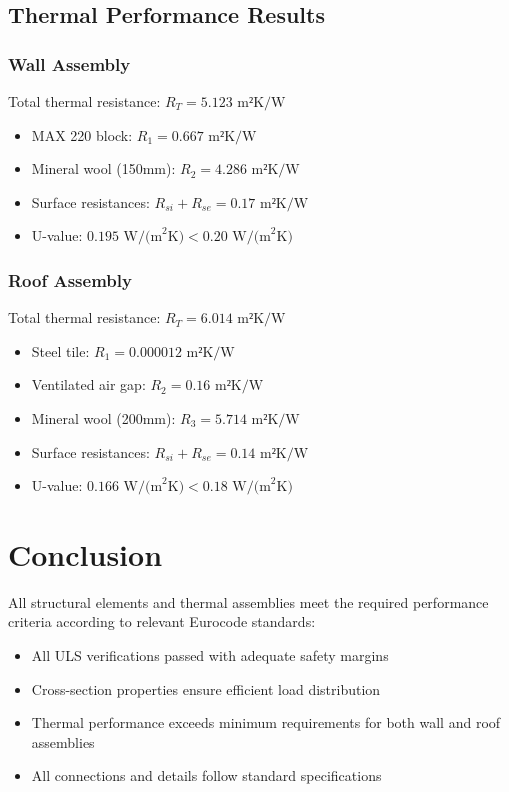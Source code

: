 \documentclass[12pt,a4paper]{article}
\begin{document}
\subsection{Thermal Performance Results}
\subsubsection{Wall Assembly}
Total thermal resistance: $R_T = 5.123 \text{ m²K/W}$
\begin{itemize}
    \item MAX 220 block: $R_1 = 0.667 \text{ m²K/W}$
    \item Mineral wool (150mm): $R_2 = 4.286 \text{ m²K/W}$
    \item Surface resistances: $R_{si} + R_{se} = 0.17 \text{ m²K/W}$
    \item U-value: $0.195 \text{ W/(m}^2\text{K)} < 0.20 \text{ W/(m}^2\text{K)}$ \checkmark
\end{itemize}

\subsubsection{Roof Assembly}
Total thermal resistance: $R_T = 6.014 \text{ m²K/W}$
\begin{itemize}
    \item Steel tile: $R_1 = 0.000012 \text{ m²K/W}$
    \item Ventilated air gap: $R_2 = 0.16 \text{ m²K/W}$
    \item Mineral wool (200mm): $R_3 = 5.714 \text{ m²K/W}$
    \item Surface resistances: $R_{si} + R_{se} = 0.14 \text{ m²K/W}$
    \item U-value: $0.166 \text{ W/(m}^2\text{K)} < 0.18 \text{ W/(m}^2\text{K)}$ \checkmark
\end{itemize}

\section{Conclusion}
All structural elements and thermal assemblies meet the required performance criteria according to relevant Eurocode standards:
\begin{itemize}
    \item All ULS verifications passed with adequate safety margins
    \item Cross-section properties ensure efficient load distribution
    \item Thermal performance exceeds minimum requirements for both wall and roof assemblies
    \item All connections and details follow standard specifications
\end{itemize}
\end{document}
